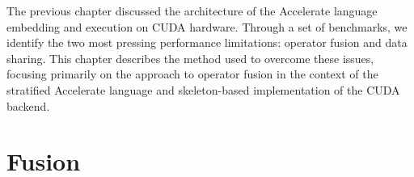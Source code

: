 % 
% 
% 

The previous chapter discussed the architecture of the Accelerate language
embedding and execution on CUDA hardware. Through a set of benchmarks, we
identify the two most pressing performance limitations: operator fusion and data
sharing. This chapter describes the method used to overcome these issues,
focusing primarily on the approach to operator fusion in the context of the
stratified Accelerate language and skeleton-based implementation of the CUDA
backend.


\section{Fusion}

